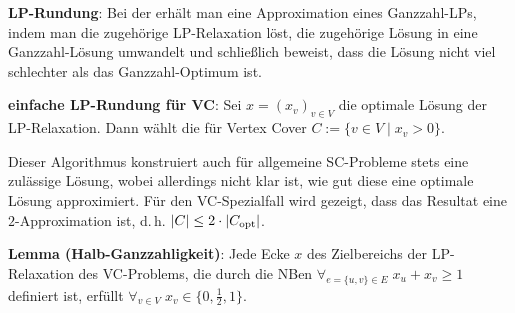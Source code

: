 \textbf{LP-Rundung}:
Bei der  erhält man eine Approximation eines Ganzzahl-LPs,
indem man die zugehörige LP-Relaxation löst, die zugehörige Lösung in eine Ganzzahl-Lösung
umwandelt und schließlich beweist, dass die Lösung nicht viel schlechter als das Ganzzahl-Optimum ist.

\linie

\textbf{einfache LP-Rundung für VC}:
Sei $x = (x_v)_{v \in V}$ die optimale Lösung der LP-Relaxation.
Dann wählt die  für Vertex Cover $C := \{v \in V \;|\; x_v > 0\}$.

Dieser Algorithmus konstruiert auch für allgemeine SC-Probleme stets eine zulässige Lösung,
wobei allerdings nicht klar ist, wie gut diese eine optimale Lösung approximiert.
Für den VC-Spezialfall wird gezeigt, dass das Resultat eine
$2$-Approximation ist, d.\,h. $|C| \le 2 \cdot |C_{\text{opt}}|$.

\linie

\textbf{Lemma (Halb-Ganzzahligkeit)}:
Jede Ecke $x$ des Zielbereichs der LP-Relaxation des VC-Problems, die durch die NBen
$\forall_{e = \{u, v\} \in E}\; x_u + x_v \ge 1$ definiert ist,
erfüllt $\forall_{v \in V}\; x_v \in \{0, \frac{1}{2}, 1\}$.

